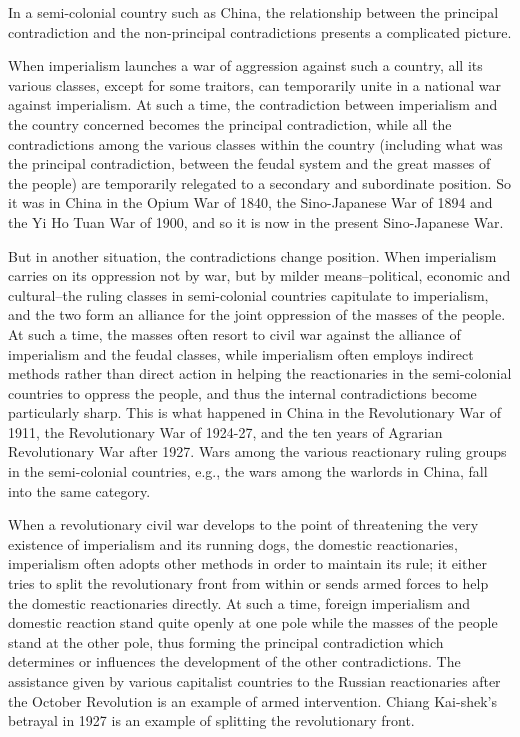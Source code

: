 \documentclass{article}
\begin{document}
In a semi-colonial country such as China, the relationship between the
principal contradiction and the non-principal contradictions presents
a complicated picture.

When imperialism launches a war of aggression against such a country, all its
various classes, except for some traitors, can temporarily unite in a national
war against imperialism. At such a time, the contradiction between imperialism
and the country concerned becomes the principal contradiction, while all the
contradictions among the various classes within the country (including what was
the principal contradiction, between the feudal system and the great masses of
the people) are temporarily relegated to a secondary and subordinate position.
So it was in China in the Opium War of 1840, the Sino-Japanese War of 1894 and
the Yi Ho Tuan War of 1900, and so it is now in the present Sino-Japanese War.

But in another situation, the contradictions change position. When imperialism
carries on its oppression not by war, but by milder means--political, economic
and cultural--the ruling classes in semi-colonial countries capitulate to
imperialism, and the two form an alliance for the joint oppression of the
masses of the people. At such a time, the masses often resort to civil war
against the alliance of imperialism and the feudal classes, while imperialism
often employs indirect methods rather than direct action in helping the
reactionaries in the semi-colonial countries to oppress the people, and thus
the internal contradictions become particularly sharp. This is what happened in
China in the Revolutionary War of 1911, the Revolutionary War of 1924-27, and
the ten years of Agrarian Revolutionary War after 1927. Wars among the various
reactionary ruling groups in the semi-colonial countries, e.g., the wars among
the warlords in China, fall into the same category.

When a revolutionary civil war develops to the point of threatening the very
existence of imperialism and its running dogs, the domestic reactionaries,
imperialism often adopts other methods in order to maintain its rule; it either
tries to split the revolutionary front from within or sends armed forces to
help the domestic reactionaries directly. At such a time, foreign imperialism
and domestic reaction stand quite openly at one pole while the masses of the
people stand at the other pole, thus forming the principal contradiction which
determines or influences the development of the other contradictions. The
assistance given by various capitalist countries to the Russian reactionaries
after the October Revolution is an example of armed intervention. Chiang
Kai-shek's betrayal in 1927 is an example of splitting the revolutionary front.
\end{document}
